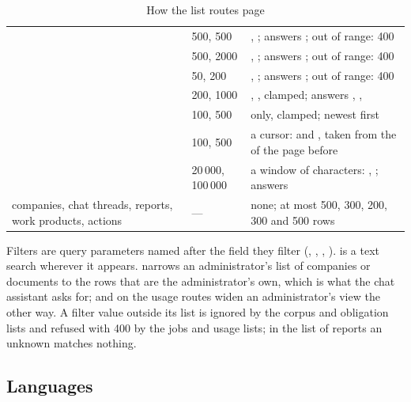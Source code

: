\begin{table}[H]
\caption{How the list routes page}\label{tab:api:paging}
\begin{tabularx}{\textwidth}{@{}L{55mm}L{27mm}Y@{}}
\toprule
{} &  &  \\
\midrule
{} & 500, 500 & , ; answers ; out of range: 400 \\
 & 500, 2000 & , ; answers ; out of range: 400 \\
 & 50, 200 & , ; answers ; out of range: 400 \\
 & 200, 1000 & , , clamped; answers , ,  \\
 & 100, 500 &  only, clamped; newest first \\
 & 100, 500 & a cursor:  and , taken from the  of the page before \\
 & 20\,000, 100\,000 & a window of characters: , ; answers  \\
companies, chat threads, reports, work products, actions & --- & none; at most 500, 300, 200, 300 and 500 rows \\
\bottomrule
\end{tabularx}
\end{table}

Filters are query parameters named after the field they filter (,
, , ).  is a text search wherever it
appears.  narrows an administrator's list of companies or documents to the rows
that are the administrator's own, which is what the chat assistant asks for; 
and  on the usage routes widen an administrator's view the other way. A filter
value outside its list is ignored by the corpus and obligation lists and refused with 400
 by the jobs and usage lists; in the list of reports an unknown
 matches nothing.

\subsection{Languages}\label{sec:api:languages}

